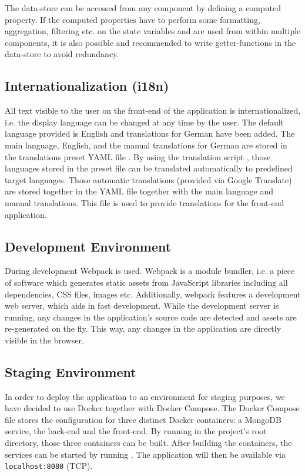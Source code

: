The data-store can be accessed from any component by defining a computed property. If the computed properties have to perform some formatting, aggregation, filtering etc. on the state variables and are used from within multiple components, it is also possible and recommended to write getter-functions in the data-store to avoid redundancy.

\subsection{Internationalization (i18n)}

All text visible to the user on the front-end of the application is internationalized, i.e. the display language can be changed at any time by the user. The default language provided is English and translations for German have been added. The main language, English, and the manual translations for German are stored in the translations preset YAML file . By using the translation script , those languages stored in the preset file can be translated automatically to predefined target languages. Those automatic translations (provided via Google Translate) are stored together in the YAML file  together with the main language and manual translations. This file is used to provide translations for the front-end application. 

\subsection{Development Environment}
During development Webpack is used. Webpack is a module bundler, i.e. a piece of software which generates static assets from JavaScript libraries including all dependencies, CSS files, images etc. Additionally, webpack features a development web server, which aids in fast development. While the development server is running, any changes in the application's source code are detected and assets are re-generated on the fly. This way, any changes in the application are directly visible in the browser.

\subsection{Staging Environment}
In order to deploy the application to an environment for staging purposes, we have decided to use Docker together with Docker Compose. The Docker Compose file  stores the configuration for three distinct Docker containers: a MongoDB service, the back-end and the front-end. By running  in the project's root directory, those three containers can be built. After building the containers, the services can be started by running . The application will then be available via \texttt{localhost:8080} (TCP).


